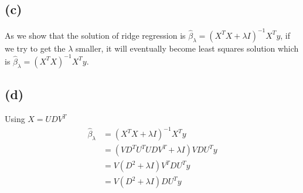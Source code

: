 \documentclass[pra,groupedaddress,amsmath,amssymb, column]{revtex4}
\begin{document}
\subsection*{(c)}
As we show that the solution of ridge regression is $\hat{\beta}_{\lambda}=(X^TX +  \lambda I)^{-1}X^T y$, if we try to get the $\lambda$ smaller, it will eventually become least squares solution which is $\hat{\beta}_{\lambda}=(X^TX )^{-1}X^T y$.
\subsection*{(d)}
Using $X=UDV^T$
\begin{align}
\hat{\beta}_{\lambda}&=(X^TX +  \lambda I)^{-1}X^T y \nonumber\\
				       &=\left( VD^TU^TUDV^T  + \lambda I \right)VDU^T y \nonumber\\
                                      &=V\left(D^2 + \lambda I \right)V^TDU^T y \nonumber\\
                                      &=V\left(D^2 + \lambda I \right)DU^T y
\end{align}
\end{document}
